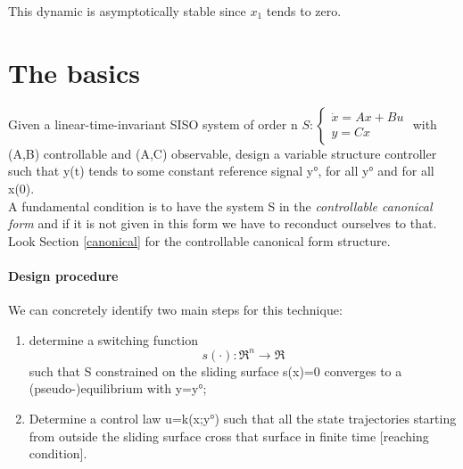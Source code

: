 This dynamic is asymptotically stable since $x_1$ tends to zero.
\section{The basics}
Given a linear-time-invariant SISO system of order n $S:\begin{cases}
	\dot{x}=Ax+Bu\\y=Cx
\end{cases}$ with (A,B) controllable and (A,C) observable, design a variable structure controller such that y(t) tends to some constant reference signal y°, for all y° and for all x(0). \\ A fundamental condition is to have the system S in the \emph{controllable canonical form} and if it is not given in this form we have to reconduct ourselves to that. Look Section \ref{canonical} for the controllable canonical form structure.
\paragraph{Design procedure} We can concretely identify two main steps for this technique:	
\begin{enumerate}
	\item determine a switching function 
	\[
	s(\cdot):\Re^n\to\Re
	\]
	such that S constrained on the sliding surface s(x)=0 converges to a (pseudo-)equilibrium with y=y°;
	\item Determine a control law u=k(x;y°) such that all the state trajectories starting from outside the sliding surface cross that surface in finite time [reaching condition].
\end{enumerate}
